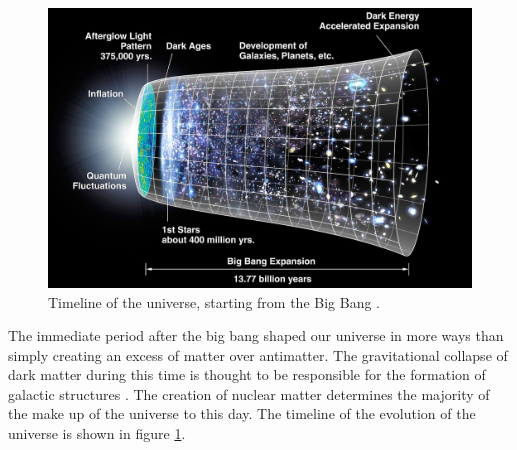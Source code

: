 \begin{figure}
    \centering
    \includegraphics[width=\textwidth]{figures/CMB_Timeline300_no_WMAP.jpg}
    \caption{Timeline of the universe, starting from the Big Bang \cite{timelineOfTheUniverse}.}
    \label{fig:TimelineOfTheUniverse}
\end{figure}

The immediate period after the big bang shaped our universe in more ways than simply creating an excess of matter over antimatter. The gravitational collapse of dark matter during this time is thought to be responsible for the formation of galactic structures \cite{Ibarra_neutrinos}. The creation of nuclear matter determines the majority of the make up of the universe to this day. The timeline of the evolution of the universe is shown in figure \ref{fig:TimelineOfTheUniverse}.

